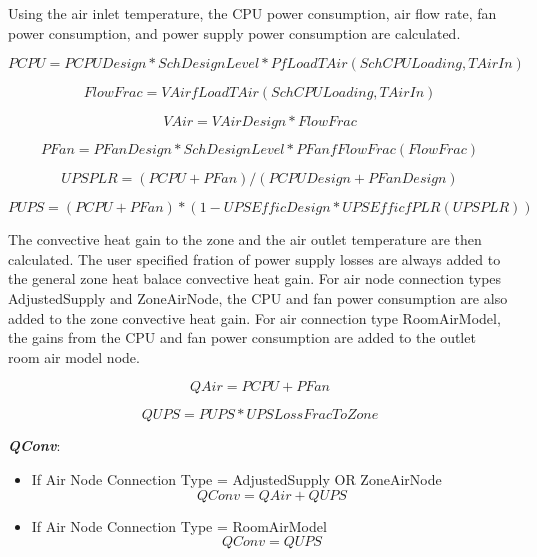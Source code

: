 Using the air inlet temperature, the CPU power consumption, air flow rate, fan power consumption, and power supply power consumption are calculated.

\begin{equation}
PCPU = PCPUDesign * SchDesignLevel * PfLoadTAir(SchCPULoading, TAirIn)
\end{equation}

\begin{equation}
FlowFrac = VAirfLoadTAir(SchCPULoading, TAirIn)
\end{equation}

\begin{equation}
VAir = VAirDesign * FlowFrac
\end{equation}

\begin{equation}
PFan = PFanDesign * SchDesignLevel * PFanfFlowFrac(FlowFrac)
\end{equation}

\begin{equation}
UPSPLR = (PCPU + PFan) / (PCPUDesign + PFanDesign)
\end{equation}

\begin{equation}
PUPS = (PCPU + PFan) * (1 - UPSEfficDesign * UPSEfficfPLR (UPSPLR))
\end{equation}

The convective heat gain to the zone and the air outlet temperature are then calculated. The user specified fration of power supply losses are always added to the general zone heat balace convective heat gain. For air node connection types AdjustedSupply and ZoneAirNode, the CPU and fan power consumption are also added to the zone convective heat gain. For air connection type RoomAirModel, the gains from the CPU and fan power consumption are added to the outlet room air model node.

\begin{equation}
QAir = PCPU + PFan
\end{equation}

\begin{equation}
QUPS = PUPS * UPSLossFracToZone
\end{equation}

\emph{\textbf{QConv}}:

\begin{itemize}
    \tightlist
  \item
    If Air Node Connection Type = AdjustedSupply OR ZoneAirNode
\begin{equation}
QConv = QAir + QUPS
\end{equation}
  \item
    If Air Node Connection Type = RoomAirModel
\begin{equation}
QConv = QUPS
\end{equation}
\end{itemize}

